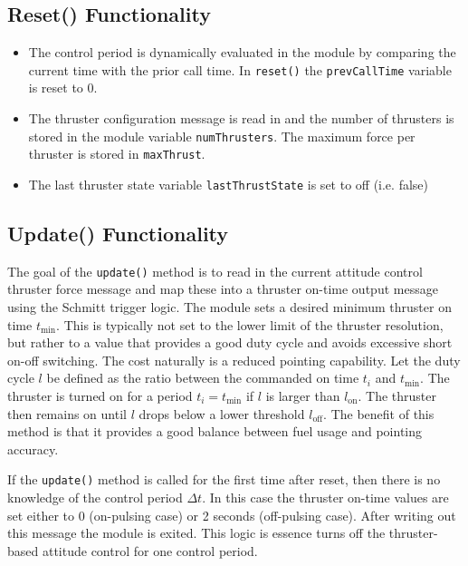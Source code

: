 \subsection{Reset() Functionality}
\begin{itemize}
	\item The control period is dynamically evaluated in the module by comparing the current time with the prior call time.  In {\tt reset()} the {\tt prevCallTime} variable is reset to 0.  
	\item The thruster configuration message is read in and the number of thrusters is stored in the module variable {\tt numThrusters}.  The maximum force per thruster is stored in {\tt maxThrust}.
	\item The last thruster state variable {\tt lastThrustState} is set to off (i.e. false)
\end{itemize}

\subsection{Update() Functionality}
The goal of the {\tt update()} method is to read in the current attitude control thruster force message and map these into a thruster on-time output message using the Schmitt trigger logic.\cite{Alcorn:2016rz}  The module sets a desired minimum thruster on time $t_{\text{min}}$.  This is typically not set to the lower limit of the thruster resolution, but rather to a value that provides a good duty cycle and avoids excessive short on-off switching.   The cost naturally is a reduced pointing capability.  Let the duty cycle $l$ be defined as the ratio between the commanded on time $t_{i}$ and $t_{\text{min}}$.  The thruster is turned on for a period $t_{i} = t_{\text{min}}$ if $l$ is larger than  $l_{\text{on}}$.  The thruster then remains on until $l$ drops below a lower threshold $l_{\text{off}}$.  The benefit of this method is that it provides a good balance between fuel usage and pointing accuracy.\cite{Alcorn:2016rz}


If the {\tt update()} method is called for the first time after reset, then there is no knowledge of the control period $\Delta t$.  In this case the thruster on-time values are set either to 0 (on-pulsing case) or 2 seconds (off-pulsing case).  After writing out this message the module is exited.  This logic is essence turns off the thruster-based attitude control for one control period. 

